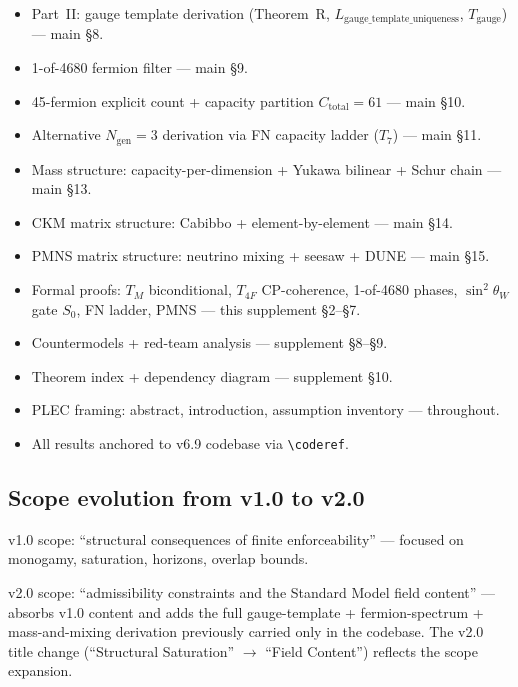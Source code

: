 \documentclass[11pt]{article}
\theoremstyle{definition}
\begin{document}
\begin{itemize}
    \item Part~II: gauge template derivation (Theorem~R, $L_{\mathrm{gauge\_template\_uniqueness}}$, $T_{\mathrm{gauge}}$) --- main \S8.
    \item 1-of-4680 fermion filter --- main \S9.
    \item 45-fermion explicit count + capacity partition $C_{\mathrm{total}} = 61$ --- main \S10.
    \item Alternative $N_{\mathrm{gen}} = 3$ derivation via FN capacity ladder ($T_7$) --- main \S11.
    \item Mass structure: capacity-per-dimension + Yukawa bilinear + Schur chain --- main \S13.
    \item CKM matrix structure: Cabibbo + element-by-element --- main \S14.
    \item PMNS matrix structure: neutrino mixing + seesaw + DUNE --- main \S15.
    \item Formal proofs: $T_M$ biconditional, $T_{4F}$ CP-coherence, 1-of-4680 phases, $\sin^2\theta_W$ gate $S_0$, FN ladder, PMNS --- this supplement \S2--\S7.
    \item Countermodels + red-team analysis --- supplement \S8--\S9.
    \item Theorem index + dependency diagram --- supplement \S10.
    \item PLEC framing: abstract, introduction, assumption inventory --- throughout.
    \item All results anchored to v6.9 codebase via \texttt{\textbackslash coderef}.
\end{itemize}

\subsection{Scope evolution from v1.0 to v2.0}\label{sec:scope_evolution}

v1.0 scope: ``structural consequences of finite enforceability'' --- focused on monogamy, saturation, horizons, overlap bounds.

v2.0 scope: ``admissibility constraints and the Standard Model field content'' --- absorbs v1.0 content and adds the full gauge-template + fermion-spectrum + mass-and-mixing derivation previously carried only in the codebase. The v2.0 title change (``Structural Saturation'' $\to$ ``Field Content'') reflects the scope expansion.
\end{document}
